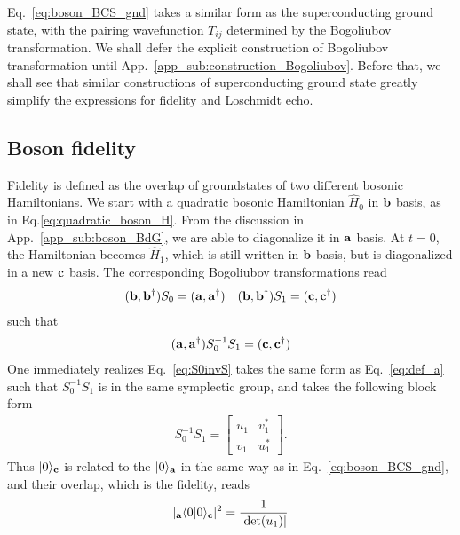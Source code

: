 Eq.~\eqref{eq:boson_BCS_gnd} takes a similar form as the superconducting ground state, with the pairing wavefunction $T_{ij}$ determined by the Bogoliubov transformation. We shall defer the explicit construction of Bogoliubov transformation until App.~\ref{app_sub:construction_Bogoliubov}. Before that, we shall see that similar constructions of superconducting ground state greatly simplify the expressions for fidelity and Loschmidt echo.

\subsection{Boson fidelity} 
\label{app_sub:boson_fidelity}

Fidelity is defined as the overlap of groundstates of two different bosonic Hamiltonians. We start with a quadratic bosonic Hamiltonian $\hat{H}_0$ in ${\bf b}$ basis, as in Eq.\eqref{eq:quadratic_boson_H}. From the discussion in App.~\ref{app_sub:boson_BdG}, we are able to diagonalize it in ${\bf a}$ basis. At $t=0$, the Hamiltonian becomes $\hat{H}_1$, which is still written in ${\bf b}$ basis, but is diagonalized in a new ${\bf c}$ basis. The corresponding Bogoliubov transformations read
\begin{eqnarray}\begin{aligned}
\label{eq:two_BdG}
({\bf b} , {\bf b}^\dagger)S_0=({\bf a} , {\bf a}^\dagger)\quad
({\bf b} , {\bf b}^\dagger)S_1=({\bf c} , {\bf c}^\dagger)
\end{aligned}\end{eqnarray}
such that
\begin{eqnarray}\begin{aligned}
\label{eq:S0invS}
({\bf a} , {\bf a}^\dagger)S_0^{-1}S_1=({\bf c} , {\bf c}^\dagger)
\end{aligned}\end{eqnarray}
One immediately realizes Eq.~\eqref{eq:S0invS} takes the same form as Eq.~\eqref{eq:def_a} such that $S_0^{-1}S_1$ is in the same symplectic group, and takes the following block form
\begin{eqnarray}
S_0^{-1}S_1=\begin{bmatrix}
u_1 & v_1^*\\
v_1 & u_1^*
\end{bmatrix}.
\end{eqnarray}
Thus $|0\rangle_{\bf c}$ is related to the $|0\rangle_{{\bf a}}$ in the same way as in Eq.~\eqref{eq:boson_BCS_gnd}, and their overlap, which is the fidelity, reads
\begin{eqnarray}\begin{aligned}
|_{\bf a}\langle0|0\rangle_{\bf c}|^2=\frac{1}{|\text{det}(u_1)|}
\end{aligned}\end{eqnarray}

